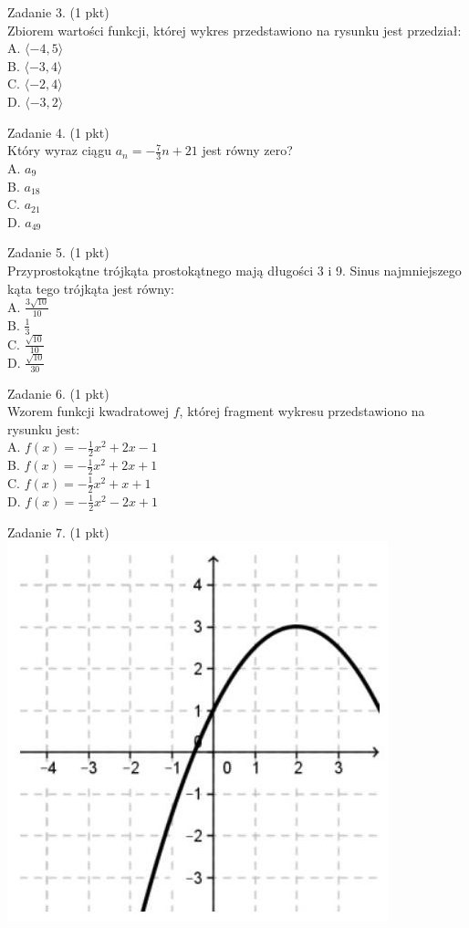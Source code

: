 \documentclass[10pt]{article}
\begin{document}
Zadanie 3. (1 pkt)\\
Zbiorem wartości funkcji, której wykres przedstawiono na rysunku jest przedział:\\
A. \(\langle-4,5\rangle\)\\
B. \(\langle-3,4\rangle\)\\
C. \(\langle-2,4\rangle\)\\
D. \(\langle-3,2\rangle\)

Zadanie 4. (1 pkt)\\
Który wyraz ciągu \(a_{n}=-\frac{7}{3} n+21\) jest równy zero?\\
A. \(a_{9}\)\\
B. \(a_{18}\)\\
C. \(a_{21}\)\\
D. \(a_{49}\)

Zadanie 5. (1 pkt)\\
Przyprostokątne trójkąta prostokątnego mają długości 3 i 9. Sinus najmniejszego kąta tego trójkąta jest równy:\\
A. \(\frac{3 \sqrt{10}}{10}\)\\
B. \(\frac{1}{3}\)\\
C. \(\frac{\sqrt{10}}{10}\)\\
D. \(\frac{\sqrt{10}}{30}\)

Zadanie 6. (1 pkt)\\
Wzorem funkcji kwadratowej \(f\), której fragment wykresu przedstawiono na rysunku jest:\\
A. \(f(x)=-\frac{1}{2} x^{2}+2 x-1\)\\
B. \(f(x)=-\frac{1}{2} x^{2}+2 x+1\)\\
C. \(f(x)=-\frac{1}{2} x^{2}+x+1\)\\
D. \(f(x)=-\frac{1}{2} x^{2}-2 x+1\)

Zadanie 7. (1 pkt)\\
\includegraphics[max width=\textwidth, center]{2024_11_21_9a9f600c3b3af5013d80g-02}
\end{document}
